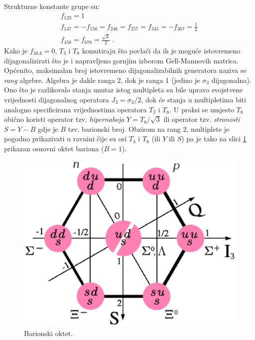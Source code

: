 Strukturne konstante grupe  su:
\begin{gather}
f_{123} = 1 \, \nonumber \\
f_{147} = -f_{156} = f_{246} = f_{257} = f_{345} = -f_{367} = \frac{1}{2} \, \\
f_{458} = f_{678} = \frac{\sqrt{3}}{2} \;. \nonumber
\end{gather}
Kako je $f_{38A}=0$, $T_3$ i $T_8$ komutiraju što povlači da ih je moguće
istovremeno dijagonalizirati što je i napravljeno gornjim izborom
Gell-Mannovih matrica.
Općenito, maksimalan broj istovremeno dijagonalizabilnih generatora naziva se 
\emph{rang} algebre.
Algebra  je dakle ranga 2, dok je  ranga 1 (jedino je $\sigma_3$ dijagonalna).
Ono što je razlikovalo stanja unutar istog  multipleta su bile upravo
svojstvene vrijednosti dijagonalnog operatora $J_3 = \sigma_3/2$, dok
će stanja u  multipletima biti analogno specificirana vrijednostima
operatora $T_3$ i $T_8$. U praksi se umjesto $T_8$ obično koristi
operator tzv. \emph{hipernaboja} $Y = T_8/\sqrt{3}$ ili operator tzv.
\emph{stranosti} $S = Y - B$ gdje je $B$ tzv. barionski broj. 
Obzirom na rang 2,  multiplete je pogodno prikazivati u ravnini
čije su osi $T_3$ i $T_8$ (ili $Y$ ili $S$) pa je tako na slici
\ref{fig:baryon_octet} prikazan osnovni oktet bariona ($B=1$).
\begin{figure}[ht]
\begin{center}
\includegraphics[scale=0.4]{pics/baryon_octet}
\end{center}
\caption{Barionski oktet.}
\label{fig:baryon_octet}
\end{figure}
